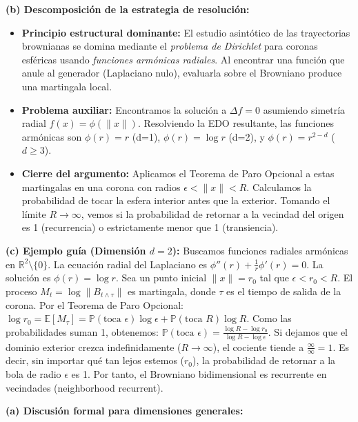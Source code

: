 \documentclass[11pt, letterpaper]{article}
\begin{document}
\begin{solucion}
    \textbf{(b) Descomposición de la estrategia de resolución:}
    \begin{itemize}
        \item[(i)] \textbf{Principio estructural dominante:} El estudio asintótico de las trayectorias brownianas se domina mediante el \textit{problema de Dirichlet} para coronas esféricas usando \textit{funciones armónicas radiales}. Al encontrar una función que anule al generador (Laplaciano nulo), evaluarla sobre el Browniano produce una martingala local.
        \item[(ii)] \textbf{Problema auxiliar:} Encontramos la solución a $\Delta f = 0$ asumiendo simetría radial $f(x) = \phi(\|x\|)$. Resolviendo la EDO resultante, las funciones armónicas son $\phi(r) = r$ (d=1), $\phi(r) = \log r$ (d=2), y $\phi(r) = r^{2-d}$ ($d \ge 3$).
        \item[(iii)] \textbf{Cierre del argumento:} Aplicamos el Teorema de Paro Opcional a estas martingalas en una corona con radios $\epsilon < \|x\| < R$. Calculamos la probabilidad de tocar la esfera interior antes que la exterior. Tomando el límite $R \to \infty$, vemos si la probabilidad de retornar a la vecindad del origen es 1 (recurrencia) o estrictamente menor que 1 (transiencia).
    \end{itemize}

    \vspace{3mm}
    \textbf{(c) Ejemplo guía (Dimensión $d=2$):}
    Buscamos funciones radiales armónicas en $\mathbb{R}^2 \setminus \{0\}$. La ecuación radial del Laplaciano es $\phi''(r) + \frac{1}{r}\phi'(r) = 0$. La solución es $\phi(r) = \log r$.
    Sea un punto inicial $\|x\| = r_0$ tal que $\epsilon < r_0 < R$. El proceso $M_t = \log \|B_{t \wedge \tau}\|$ es martingala, donde $\tau$ es el tiempo de salida de la corona.
    Por el Teorema de Paro Opcional: $\log r_0 = \mathbb{E}[M_\tau] = \mathbb{P}(\text{toca } \epsilon) \log \epsilon + \mathbb{P}(\text{toca } R) \log R$.
    Como las probabilidades suman 1, obtenemos:
    $\mathbb{P}(\text{toca } \epsilon) = \frac{\log R - \log r_0}{\log R - \log \epsilon}$.
    Si dejamos que el dominio exterior crezca indefinidamente ($R \to \infty$), el cociente tiende a $\frac{\infty}{\infty} = 1$. Es decir, sin importar qué tan lejos estemos ($r_0$), la probabilidad de retornar a la bola de radio $\epsilon$ es 1. Por tanto, el Browniano bidimensional es recurrente en vecindades (neighborhood recurrent).

    \vspace{3mm}
    \textbf{(a) Discusión formal para dimensiones generales:}


\end{solucion}
\end{document}
